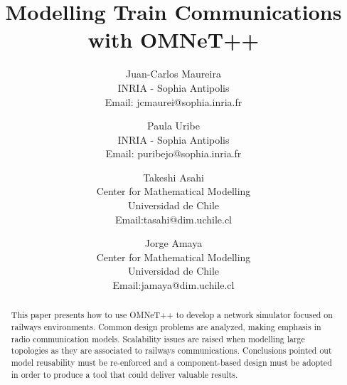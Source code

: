 \documentclass[times, 10pt,twocolumn]{article}
\begin{document}
\title{Modelling Train Communications with OMNeT++}

\author{Juan-Carlos Maureira\\
INRIA - Sophia Antipolis\\
Email: jcmaurei@sophia.inria.fr\\
\and
Paula Uribe\\
INRIA - Sophia Antipolis\\
Email: puribejo@sophia.inria.fr\\
\and
Takeshi Asahi\\
Center for Mathematical Modelling\\
Universidad de  Chile\\
Email:tasahi@dim.uchile.cl\\
\and
Jorge Amaya\\
Center for Mathematical Modelling\\
Universidad de  Chile\\
Email:jamaya@dim.uchile.cl\\
}

\maketitle
\thispagestyle{empty}

\begin{abstract}
	This paper presents how to use OMNeT++ to develop a network simulator focused
	on railways environments. Common design problems are analyzed, making emphasis
	in radio communication models. Scalability issues are raised when modelling
	large topologies as they are associated to railways communications.
	Conclusions pointed out model reusability must be re-enforced and a
	component-based design must be adopted in order to produce a tool that could
	deliver valuable results. 
\end{abstract}

\end{document}
